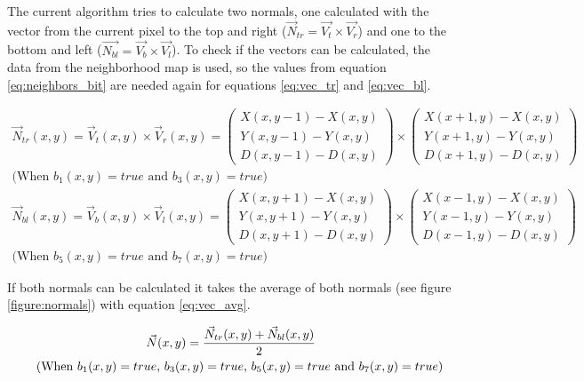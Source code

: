 The current algorithm tries to calculate two normals, one calculated with the vector from the current pixel to the top and right 
($\vec{N}_{tr}=\vec{V_t}\times\vec{V_r}$) and one to the bottom and left ($\vec{N_{bl}}=\vec{V_b}\times\vec{V_l}$). To check
if the vectors can be calculated, the data from the neighborhood map is used, so the values from equation 
\vref{eq:neighbors_bit} are needed again for equations \vref{eq:vec_tr} and \vref{eq:vec_bl}. 


\begin{gather}
 \vec{N}_{tr}(x,y)=    \vec{V}_t(x,y) \times \vec{V}_r(x,y) =
                  \left( \begin{array}{c}   X(x,y-1) -  X(x,y)  \\ Y(x,y-1) -  Y(x,y) \\ D(x,y-1) -  D(x,y)\end{array} \right) 
           \times \left( \begin{array}{c}   X(x+1,y) -  X(x,y)  \\ Y(x+1,y) -  Y(x,y) \\ D(x+1,y) -  D(x,y)\end{array} \right)\nonumber
			\\\mbox{(When $b_1(x,y)=true$ and $b_3(x,y)=true$)}
\label{eq:vec_tr}\\
 \vec{N}_{bl}(x,y)=    \vec{V}_b(x,y) \times \vec{V}_l(x,y) =
                  \left( \begin{array}{c}   X(x,y+1) -  X(x,y)  \\ Y(x,y+1) -  Y(x,y) \\ D(x,y+1) -  D(x,y)\end{array} \right) 
           \times \left( \begin{array}{c}   X(x-1,y) -  X(x,y)  \\ Y(x-1,y) -  Y(x,y) \\ D(x-1,y) -  D(x,y)\end{array} \right)\nonumber
			\\\mbox{(When $b_5(x,y)=true$ and $b_7(x,y)=true$)}
\label{eq:vec_bl}
\end{gather}

If both normals can be calculated it takes the average of both normals (see figure \vref{figure:normals}) with equation 
\vref{eq:vec_avg}.

\begin{gather}
	\vec{N}(x,y) = \frac{\vec{N}_{tr}(x,y) + \vec{N}_{bl}(x,y)}{2}\nonumber\\
\mbox{\hspace{0.5cm}(When $b_1(x,y)=true$, $b_3(x,y)=true$, $b_5(x,y)=true$ and $b_7(x,y)=true$)}
\label{eq:vec_avg} 
\end{gather} 


